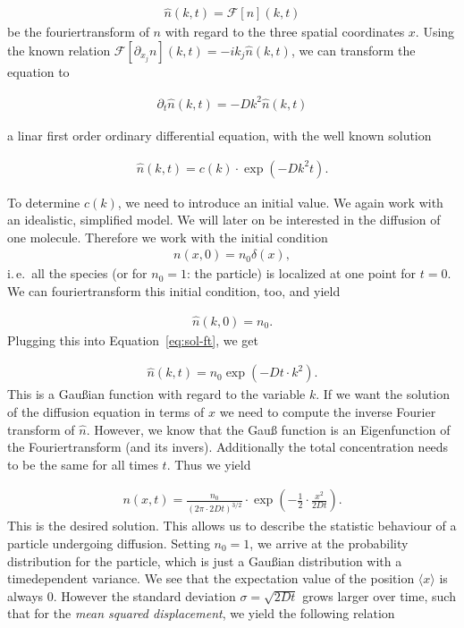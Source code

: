 \begin{align*}
  \hat n(k,t) = \mathcal{F}[n](k,t)
\end{align*}
be the fouriertransform of $n$ with regard to the three spatial
coordinates $x$. Using the known relation $\mathcal{F}[\partial_{x_j}
n](k,t) = -ik_j \hat n(k,t)$, we can transform the equation to

\begin{align*}
  \partial_t \hat n(k,t) =  - Dk^2 \hat n(k,t)
\end{align*}

a linar first order ordinary differential equation, with the well
known solution

\begin{align}
  \hat n(k,t) = c(k) \cdot \exp(-Dk^2 t). \label{eq:sol-ft}
\end{align}

To determine $c(k)$, we need to introduce an initial value. We again
work with an idealistic, simplified model. We will later on be
interested in the diffusion of one molecule. Therefore we work with
the initial condition
\begin{align*}
  n(x,0) = n_0 \delta(x),
\end{align*}
i.\,e.\ all the species (or for $n_0 = 1$: the particle) is localized
at one point for $t = 0$. We can fouriertransform this initial
condition, too, and yield

\begin{align*}
  \hat n(k,0) = n_0.
\end{align*}
Plugging this into Equation~\eqref{eq:sol-ft}, we get

\begin{align*}
  \hat n(k,t) = n_0 \exp(-Dt \cdot k^2).
\end{align*}
This is a Gaußian function with regard to the variable $k$. If we want
the solution of the diffusion equation in terms of $x$ we need to
compute the inverse Fourier transform of $\hat n$. However, we know
that the Gauß function is an Eigenfunction of the Fouriertransform
(and its invers). Additionally the total concentration needs to be the
same for all times $t$. Thus we yield

\begin{align*}
  n(x,t) = \frac{n_0}{(2\pi \cdot 2Dt)^{3/2}} \cdot \exp \left(
  -\frac{1}{2} \cdot \frac{x^2}{2Dt} \right).
\end{align*}
This is the desired solution. This allows us to describe the statistic
behaviour of a particle undergoing diffusion. Setting $n_0 = 1$, we
arrive at the probability distribution for the particle, which is just
a Gaußian distribution with a timedependent variance. We see that the
expectation value of the position $\langle x \rangle$ is always
0. However the standard deviation $\sigma = \sqrt{2Dt}$ grows larger
over time, such that for the \emph{mean squared displacement}, we
yield the following relation

